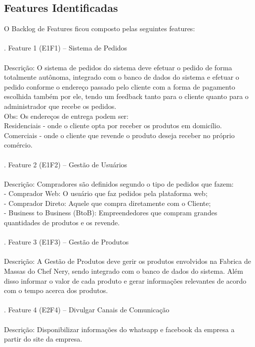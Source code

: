 \subsection{Features Identificadas}
O Backlog de Features ficou composto pelas seguintes features:\\
\\
. Feature 1 (E1F1) – Sistema de Pedidos\\
\\
\tab Descrição: O sistema de pedidos do sistema deve efetuar o pedido de forma totalmente autônoma, integrado com o banco de dados do sistema  e efetuar o pedido conforme o endereço passado pelo cliente com a forma de pagamento escolhida também por ele, tendo um feedback tanto para o cliente quanto para o administrador que recebe os pedidos.\\
\tab Obs: Os endereços de entrega podem ser:\\
\tab Residenciais - onde o cliente opta por receber os produtos em domicílio.\\
\tab Comerciais - onde o cliente que revende o produto deseja receber no próprio comércio.\\
\\
. Feature 2 (E1F2) – Gestão de Usuários\\
\\
\tab Descrição: Compradores são definidos segundo o tipo de pedidos que fazem:\\
\tab - Comprador Web: O usuário que faz pedidos pela plataforma web;\\
\tab - Comprador Direto: Aquele que compra diretamente com o Cliente;\\
\tab - Business to Business (BtoB): Empreendedores que compram grandes quantidades de produtos e os revende.\\
\\
. Feature 3 (E1F3) – Gestão de Produtos\\
\\
\tab Descrição: A Gestão de Produtos deve gerir os produtos envolvidos na Fabrica de Massas do Chef Nery, sendo integrado com o banco de dados do sistema. Além disso informar o valor de cada produto e gerar informações relevantes de acordo com o tempo acerca dos produtos.\\
\\
. Feature 4 (E2F4) – Divulgar Canais de Comunicação\\
\\
\tab Descrição: Disponibilizar informações do whatsapp e facebook da empresa a partir do site da empresa.\\

